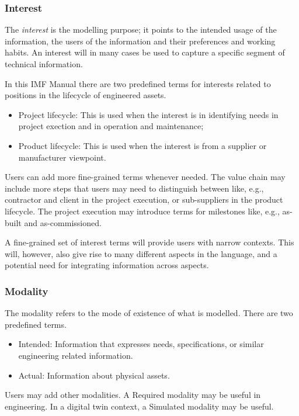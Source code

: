 \documentclass[../main.tex]{subfiles}
\begin{document}
\subsubsection{Interest}
The \textit{interest} is the modelling purpose; it points to the intended usage of the information, the users of the information and  their preferences and working habits.  An interest will in many cases be used to capture a specific segment of technical information. 

In this IMF  Manual there are two predefined terms for interests related to positions in the lifecycle of engineered assets.
\begin{itemize}
    \item Project lifecycle: This is used when the interest is in identifying   needs in project exection and in operation  and maintenance;
    \item Product lifecycle: This is used when the interest is from a supplier or manufacturer viewpoint.
    
\end{itemize}
 Users can add more fine-grained terms whenever needed. The value chain may include more steps that  users may need to distinguish between like, e.g., contractor and client in the project execution, or sub-suppliers in the product lifecycle. The project execution may introduce terms for milestones like, e.g., as-built and as-commissioned.  


A fine-grained set of interest terms
will provide users with  narrow contexts. This will, however, also give rise to many different aspects in the language, and a potential need for integrating information across aspects. 


\subsubsection{Modality}
The modality refers to the mode of existence of what is modelled. There are two predefined terms.
\begin{itemize}
    \item Intended: Information that expresses needs, specifications, or similar  engineering related information.    
    \item Actual: Information about physical assets.
\end{itemize}
Users may add other modalities. A Required modality may be useful in engineering.  In a digital twin context, a Simulated modality may be useful. 
\end{document}
